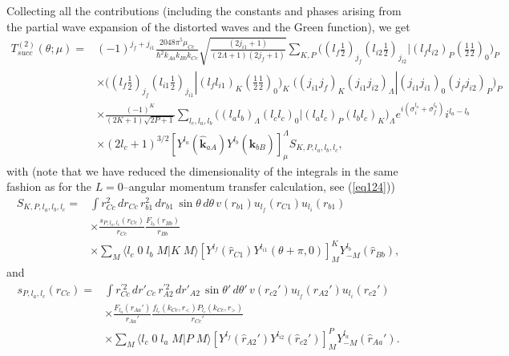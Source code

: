 Collecting all the contributions (including the constants and phases arising from the partial wave expansion of the distorted waves and the Green function), we  get
\begin{equation}\label{eq222}
 \begin{split}
T_{succ}^{(2)}(\theta;\mu)=&(-1)^{j_f+j_{i1}}\frac{2048\pi^{5}\mu_{Cc}}{ \hbar^2 k_{Aa}k_{Bb}k_{Cc}}\sqrt{\frac{(2j_{i1}+1)}{(2\Lambda+1)(2j_f+1)}}\sum_{K,P}
\bigl ( (l_f \tfrac{1}{2})_{j_f} (l_{i2} \tfrac{1}{2})_{j_{i2}} |(l_f l_{i2})_P (\tfrac{1}{2} \tfrac{1}{2})_0 \bigr )_P\\
&\times
\bigl ( (l_f \tfrac{1}{2})_{j_f} (l_{i1} \tfrac{1}{2})_{j_{i1}} |(l_f l_{i1})_K (\tfrac{1}{2} \tfrac{1}{2})_0 \bigr )_K\;
\bigl ( (j_{i1} j_f)_K (j_{i1} j_{i2})_\Lambda |(j_{i1}  j_{i1})_0 (j_f j_{i2})_P \bigr )_P\\
&\times \frac{(-1)^K}{(2K+1)\sqrt{2P+1}} \sum_{l_c,l_a,l_b}\bigl ((l_a l_b)_\Lambda (l_c l_c)_0 |(l_a l_c)_P (l_b l_c)_K \bigr )_\Lambda e^{i(\sigma _i^{l_a}+\sigma _f^{l_b})}i^{l_a-l_b}\\
&\times (2l_c+1)^{3/2} \left[ Y ^{l_a} (\hat{\mathbf{k}}_{aA}) Y ^{l_{b}} (\hat{\mathbf{k}}_{bB}) \right]^{\Lambda}_\mu S_{K,P,l_a,l_b,l_c},
 \end{split}
\end{equation}
with (note that we have reduced the dimensionality of the integrals in the same fashion as for the $L=$0--angular momentum transfer calculation, see (\ref{eq124}))
\begin{equation}\label{eq223}
 \begin{split}
S_{K,P,l_a,l_b,l_c}=&\int r_{Cc}^2 \, d r_{Cc}\,r_{b1}^2\, d r_{b1} \,\sin\theta\, d\theta \, v(r_{b1}) u_{l_f}(r_{C1})u_{l_i}(r_{b1})\\
& \times \frac{s_{P,l_a,l_c}(r_{Cc})}{r_{Cc}}\frac{F_{l_b}(r_{Bb})}{r_{Bb}}\\
&\times\sum_M \langle l_c \;0\;l_b\;M|K\;M\rangle \left[ Y ^{l_f} (\hat r_{C1}) Y ^{l_{i1}} (\theta+\pi,0) \right] _{M}^{K}
 Y^{l_b}_{-M} (\hat r_{Bb}),
 \end{split}
\end{equation}
and
\begin{equation}\label{eq224}
 \begin{split}
s_{P,l_a,l_c}(r_{Cc})=&\int r_{Cc}^{'2} \, d r'_{Cc}\,r_{A2}^{'2}\, d r'_{A2} \,\sin\theta'\, d\theta' \, v(r_{c2}') u_{l_f}(r_{A2}')u_{l_i}(r_{c2}')  \\
& \times \frac{F_{l_a}(r_{Aa}')}{r_{Aa}'}\frac{f_{l_c}(k_{Cc},r_<)P_{l_c}(k_{Cc},r_>)}{r_{Cc}'}\\
&\times\sum_M \langle l_c \;0\;l_a\;M|P\;M\rangle \left[ Y ^{l_f} (\hat r_{A2}') Y ^{l_{i2}} (\hat r_{c2}') \right] _{M}^{P}
 Y^{l_a}_{-M} (\hat r_{Aa}').
 \end{split}
\end{equation}
